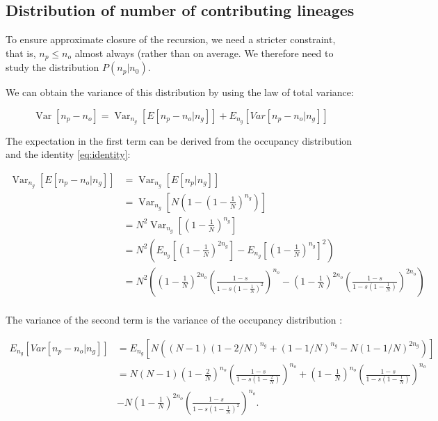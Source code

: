 \documentclass[review]{elsarticle}
\newcommand{\Var}{\operatorname{Var}}
\begin{document}
\subsection{Distribution of number of contributing lineages}
\label{subsec:distribution}

To ensure approximate closure of the recursion, we need a stricter constraint, that is,
$n_p\leq n_o$ almost always (rather than on average. We therefore need to study the distribution
$P(n_p|n_0)$.

We can obtain the variance of this distribution by using the law of total variance:

\begin{equation}
\Var\left[n_p-n_o \right] = \Var_{n_g}\left[E\left[n_p-n_o | n_g \right]\right]+  E_{n_g}\left[Var\left[n_p-n_o | n_g \right]\right] 
\end{equation}

The expectation in the first term can be derived from the occupancy distribution and the identity \ref{eq:identity}:

\begin{equation}
\begin{split}
\Var_{n_g}\left[E\left[n_p-n_o | n_g \right]\right] &= \Var_{n_g}\left[E\left[n_p| n_g \right]\right] \\
&= \Var_{n_g}\left[N\left(1-(1-\frac{1}{N})^{n_g} \right) \right] \\ 
&= N^2 \Var_{n_g}\left[(1-\frac{1}{N})^{n_g} \right] \\
&= N^2 \left( E_{n_g}\left[(1-\frac{1}{N})^{2n_g} \right] - E_{n_g}\left[(1-\frac{1}{N})^{n_g} \right]^2\right) \\
&= N^2 \left( \left(1-\frac{1}{N}\right)^{2n_o} \left(\frac{1-s}{1-s  \left(1-\frac{1}{N}\right)^2}\right)^{n_o} 
-   \left(1-\frac{1}{N}\right)^{2n_o} \left(\frac{1-s}{1-s  \left(1-\frac{1}{N}\right)}\right)^{2n_o} \right) \\
\end{split}
\end{equation}

The variance of the second term is the variance of the occupancy distribution \cite{}:

\begin{equation}
\begin{split}
E_{n_g}\left[Var\left[n_p-n_o | n_g \right]\right] & = E_{n_g}\left[N ((N - 1) (1 - 2/N)^{n_g} + (1 - 1/N)^{n_g} - N (1 - 1/N)^{2 n_g}) \right] \\
& = N (N-1)  \left(1-\frac{2}{N}\right)^{n_o} \left(\frac{1-s}{1-s  \left(1-\frac{2}{N}\right)}\right)^{n_o} +  \left(1-\frac{1}{N}\right)^{n_o} \left(\frac{1-s}{1-s  \left(1-\frac{1}{N}\right)}\right)^{n_o} \\
&-N  \left(1-\frac{1}{N}\right)^{2n_o} \left(\frac{1-s}{1-s  \left(1-\frac{1}{N}\right)^2}\right)^{n_o}. 
\end{split}
\end{equation}
\end{document}

